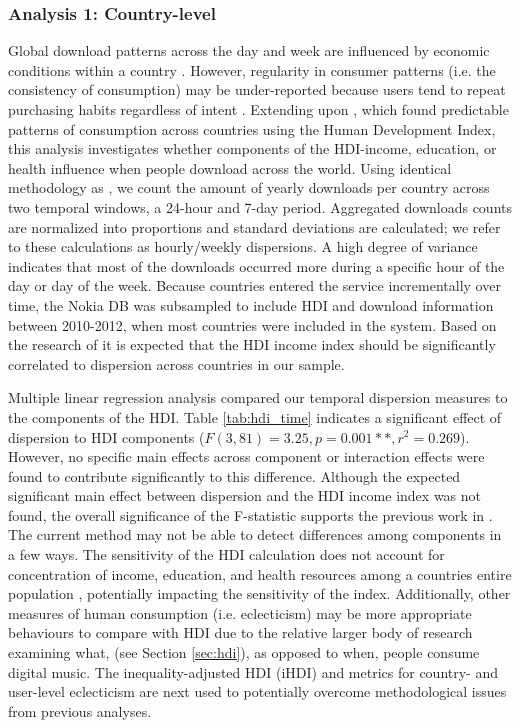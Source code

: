 \documentclass[a4paper]{article}
\begin{document}
\subsubsection{Analysis 1: Country-level}
Global download patterns across the day and week are influenced by economic conditions within a country \cite{woolhouse2013work}. However, regularity in consumer patterns (i.e. the consistency of consumption) may be under-reported because users tend to repeat purchasing habits regardless of intent \cite{ji2007purchase}. Extending upon \cite{woolhouse2013work}, which found predictable patterns of consumption across countries using the Human Development Index, this analysis investigates whether components of the \Gls{HDI}-income, education, or health influence when people download across the world. Using identical methodology as \cite{woolhouse2013work}, we count the amount of yearly downloads per country across two temporal windows, a 24-hour and 7-day period. Aggregated downloads counts are normalized into proportions and standard deviations are calculated; we refer to these calculations as hourly/weekly dispersions. A high degree of variance indicates that most of the downloads occurred more during a specific hour of the day or day of the week. Because countries entered the service incrementally over time, the Nokia DB was subsampled to include \Gls{HDI} and download information between 2010-2012, when most countries were included in the system. Based on the research of \cite{woolhouse2013work} it is expected that the \Gls{HDI} income index should be significantly correlated to dispersion across countries in our sample.

Multiple linear regression analysis compared our temporal dispersion measures to the components of the \Gls{HDI}. Table \ref{tab:hdi_time} indicates a significant effect of dispersion to \Gls{HDI} components ($F(3,81)=3.25,p=0.001**,r^2=0.269$). However, no specific main effects across component or interaction effects were found to contribute significantly to this difference. Although the expected significant main effect between dispersion and the \Gls{HDI} income index was not found, the overall significance of the F-statistic supports the previous work in \cite{woolhouse2013work}. The current method may not be able to detect differences among components in a few ways. The sensitivity of the \Gls{HDI} calculation does not account for concentration of income, education, and health resources among a countries entire population \cite{hicks1997inequality}, potentially impacting the sensitivity of the index. Additionally, other measures of human consumption (i.e. eclecticism) may be more appropriate behaviours to compare with \Gls{HDI} due to the relative larger body of research examining what, (see Section \ref{sec:hdi}), as opposed to when, people consume digital music. The inequality-adjusted \Gls{HDI} (\Gls{iHDI}) and metrics for country- and user-level eclecticism are next used to potentially overcome methodological issues from previous analyses.
\end{document}
